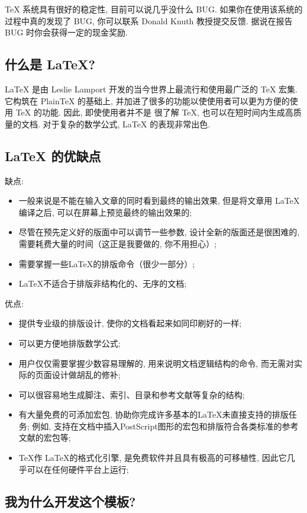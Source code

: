 \documentclass[bachelor]{cugthesis}
\begin{document}
    \TeX{} 系统具有很好的稳定性, 目前可以说几乎没什么 BUG. 如果你在使用该系统的过程中真的发现了
    BUG, 你可以联系 Donald Knuth 教授提交反馈. 据说在报告 BUG 时你会获得一定的现金奖励.
\subsection{什么是 \LaTeX{}?}
\label{sec:sub_what_is_latex_}
    \LaTeX{} 是由 Leslie Lamport 开发的当今世界上最流行和使用最广泛的 \TeX{} 宏集. 它构筑在 PlainTeX
    的基础上, 并加进了很多的功能以使使用者可以更为方便的使用 \TeX{} 的功能. 因此, 即使使用者并不是
    很了解 \TeX{}, 也可以在短时间内生成高质量的文档. 对于复杂的数学公式, \LaTeX{} 的表现非常出色.

\subsection{\LaTeX{} 的优缺点}
\label{sec:sub_latex_advantages_disabvantages_}
缺点: 
\begin{itemize}
    \item 一般来说是不能在输入文章的同时看到最终的输出效果, 但是将文章用 \LaTeX{}编译之后, 可以在屏幕上预览最终的输出效果的; 
    \item 尽管在预先定义好的版面中可以调节一些参数, 设计全新的版面还是很困难的, 需要耗费大量的时间（这正是我要做的, 你不用担心）; 
    \item 需要掌握一些\LaTeX{}的排版命令（很少一部分）; 
    \item \LaTeX{}不适合于排版非结构化的、无序的文档; 
\end{itemize}

优点:
\begin{itemize}
    \item 提供专业级的排版设计, 使你的文档看起来如同印刷好的一样; 
    \item 可以更方便地排版数学公式; 
    \item 用户仅仅需要掌握少数容易理解的, 用来说明文档逻辑结构的命令, 而无需对实际的页面设计做胡乱的修补; 
    \item 可以很容易地生成脚注、索引、目录和参考文献等复杂的结构; 
    \item 有大量免费的可添加宏包, 协助你完成许多基本的LaTeX未直接支持的排版任务; 例如, 支持在文档中插入PostScript图形的宏包和排版符合各类标准的参考文献的宏包等; 
    \item \TeX{}作 \LaTeX{}的格式化引擎, 是免费软件并且具有极高的可移植性, 因此它几乎可以在任何硬件平台上运行; 
\end{itemize}
\subsection{我为什么开发这个模板?}
\end{document}
